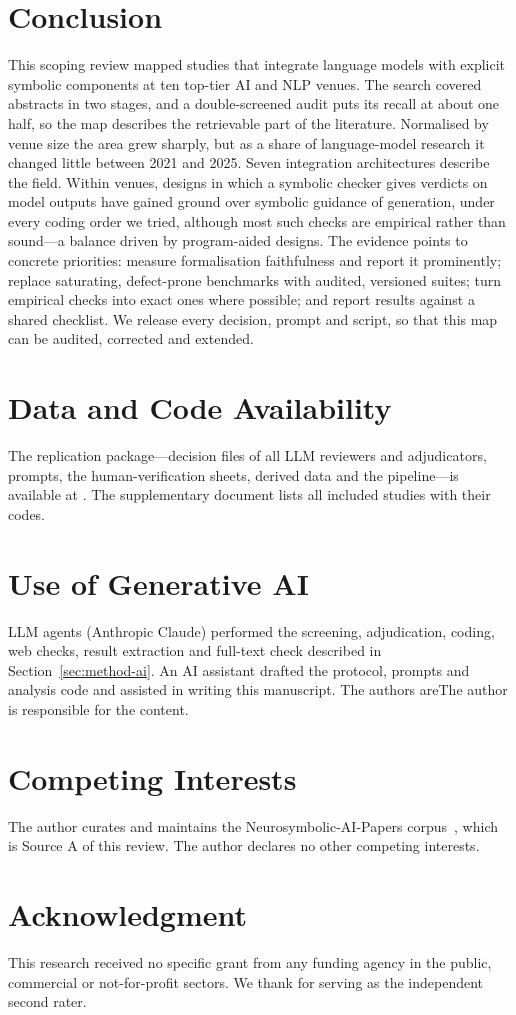 \section{Conclusion}
\label{sec:conclusion}
This scoping review mapped  studies that integrate language models with explicit symbolic components at ten top-tier AI and NLP venues. The search covered  abstracts in two stages, and a double-screened audit puts its recall at about one half, so the map describes the retrievable part of the literature. Normalised by venue size the area grew sharply, but as a share of language-model research it changed little between 2021 and 2025. Seven integration architectures describe the field. Within venues, designs in which a symbolic checker gives verdicts on model outputs have gained ground over symbolic guidance of generation, under every coding order we tried, although most such checks are empirical rather than sound---a balance driven by program-aided designs. The evidence points to concrete priorities: measure formalisation faithfulness and report it prominently; replace saturating, defect-prone benchmarks with audited, versioned suites; turn empirical checks into exact ones where possible; and report results against a shared checklist. We release every decision, prompt and script, so that this map can be audited, corrected and extended.

\section*{Data and Code Availability}
The replication package---decision files of all LLM reviewers and adjudicators, prompts, the human-verification sheets, derived data and the pipeline---is available at \repourl. The supplementary document lists all  included studies with their codes.

\section*{Use of Generative AI}
LLM agents (Anthropic Claude) performed the screening, adjudication, coding, web checks, result extraction and full-text check described in Section~\ref{sec:method-ai}. An AI assistant drafted the protocol, prompts and analysis code and assisted in writing this manuscript. \ifanonymous The authors are\else The author is\fi{} responsible for the content.

\ifanonymous
\else
\section*{Competing Interests}
The author curates and maintains the Neurosymbolic-AI-Papers corpus~\cite{thakur2026repo}, which is Source A of this review. The author declares no other competing interests.

\section*{Acknowledgment}
This research received no specific grant from any funding agency in the public, commercial or not-for-profit sectors.
\ifsecondrater We thank \secondratername{} for serving as the independent second rater.\fi
\fi
